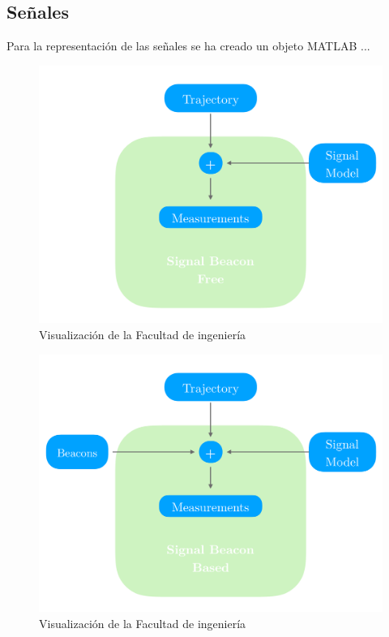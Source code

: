 \subsection{Señales}
Para la representación de las  señales se ha creado un objeto MATLAB ...
\begin{figure}
    \includegraphics[width=1.0\columnwidth]{img/Design/3.pdf}
    \caption[]{Visualización de la Facultad de ingeniería}
\end{figure}
\begin{figure}
    \includegraphics[width=1.0\columnwidth]{img/Design/4.pdf}
    \caption[]{Visualización de la Facultad de ingeniería}
\end{figure}
